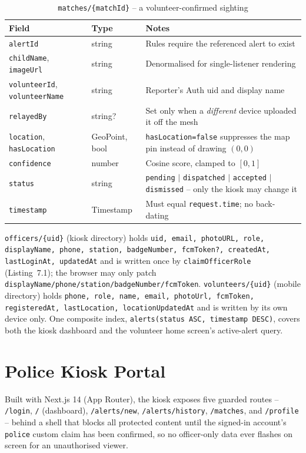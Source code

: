 \documentclass[12pt,a4paper,oneside]{report}
\newcommand{\code}[1]{\texttt{#1}}
\begin{document}
\begin{table}[H]
\centering
\caption{\code{matches/\{matchId\}} -- a volunteer-confirmed sighting}
\begin{tabular}{|p{3.4cm}|p{2.2cm}|p{7.1cm}|}
\hline
\textbf{Field} & \textbf{Type} & \textbf{Notes} \\
\hline
\code{alertId} & string & Rules require the referenced alert to exist \\ \hline
\code{childName}, \code{imageUrl} & string & Denormalised for single-listener rendering \\ \hline
\code{volunteerId}, \code{volunteerName} & string & Reporter's Auth uid and display name \\ \hline
\code{relayedBy} & string? & Set only when a \emph{different} device uploaded it off the mesh \\ \hline
\code{location}, \code{hasLocation} & GeoPoint, bool & \code{hasLocation=false} suppresses the map pin instead of drawing $(0,0)$ \\ \hline
\code{confidence} & number & Cosine score, clamped to $[0,1]$ \\ \hline
\code{status} & string & \code{pending} $\mid$ \code{dispatched} $\mid$ \code{accepted} $\mid$ \code{dismissed} -- only the kiosk may change it \\ \hline
\code{timestamp} & Timestamp & Must equal \code{request.time}; no back-dating \\
\hline
\end{tabular}
\end{table}

\code{officers/\{uid\}} (kiosk directory) holds
\code{uid, email, photoURL, role, displayName, phone, station, badgeNumber,
fcmToken?, createdAt, lastLoginAt, updatedAt} and is written once by
\code{claimOfficerRole} (Listing~7.1); the browser may only patch
\code{displayName/phone/station/badgeNumber/fcmToken}. \code{volunteers/\{uid\}}
(mobile directory) holds \code{phone, role, name, email, photoUrl, fcmToken,
registeredAt, lastLocation, locationUpdatedAt} and is written by its own
device only. One composite index, \code{alerts(status ASC, timestamp DESC)},
covers both the kiosk dashboard and the volunteer home screen's active-alert
query.

\section{Police Kiosk Portal}

Built with Next.js 14 (App Router), the kiosk exposes five guarded routes --
\code{/login}, \code{/} (dashboard), \code{/alerts/new}, \code{/alerts/history},
\code{/matches}, and \code{/profile} -- behind a shell that blocks all
protected content until the signed-in account's \code{police} custom claim
has been confirmed, so no officer-only data ever flashes on screen for an
unauthorised viewer.
\end{document}
